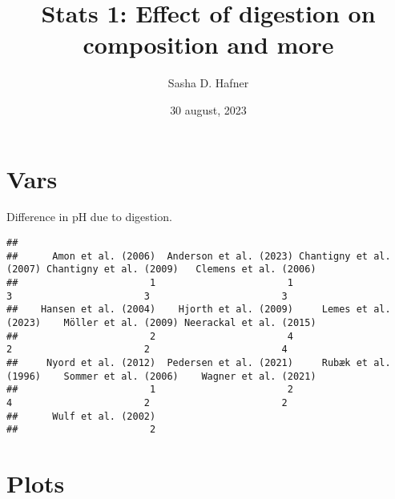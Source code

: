 \documentclass[
]{article}
\title{Stats 1: Effect of digestion on composition and more}
\author{Sasha D. Hafner}
\date{30 august, 2023}
\newenvironment{Shaded}{\begin{snugshade}}{\end{snugshade}}
\newcommand{\FunctionTok}[1]{\textcolor[rgb]{0.13,0.29,0.53}{\textbf{#1}}}
\newcommand{\NormalTok}[1]{#1}
\newcommand{\OtherTok}[1]{\textcolor[rgb]{0.56,0.35,0.01}{#1}}
\newcommand{\SpecialCharTok}[1]{\textcolor[rgb]{0.81,0.36,0.00}{\textbf{#1}}}
\begin{document}
\maketitle

\hypertarget{vars}{%
\section{Vars}\label{vars}}

Difference in pH due to digestion.

\begin{Shaded}
\end{Shaded}

\begin{Shaded}
\end{Shaded}

\begin{verbatim}
## 
##      Amon et al. (2006)  Anderson et al. (2023) Chantigny et al. (2007) Chantigny et al. (2009)   Clemens et al. (2006) 
##                       1                       1                       3                       3                       3 
##    Hansen et al. (2004)    Hjorth et al. (2009)     Lemes et al. (2023)    Möller et al. (2009) Neerackal et al. (2015) 
##                       2                       4                       2                       2                       4 
##     Nyord et al. (2012)  Pedersen et al. (2021)     Rubæk et al. (1996)    Sommer et al. (2006)    Wagner et al. (2021) 
##                       1                       2                       4                       2                       2 
##      Wulf et al. (2002) 
##                       2
\end{verbatim}

\hypertarget{plots}{%
\section{Plots}\label{plots}}
\end{document}
